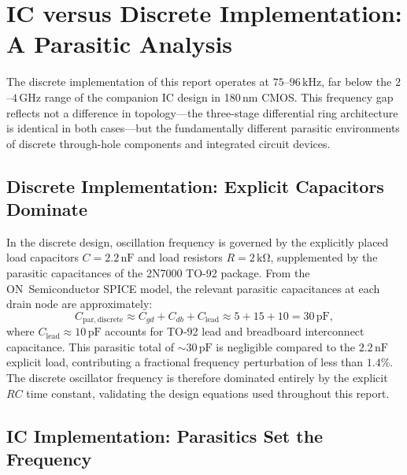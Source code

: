 \documentclass[11pt]{article}
\begin{document}
\section{IC versus Discrete Implementation: A Parasitic Analysis}
 
The discrete implementation of this report operates at $75$--$96\,\mathrm{kHz}$,
far below the $2$--$4\,\mathrm{GHz}$ range of the companion IC design in
180\,nm CMOS. This frequency gap reflects not a difference in topology---the
three-stage differential ring architecture is identical in both cases---but the
fundamentally different parasitic environments of discrete through-hole
components and integrated circuit devices.
 
\subsection{Discrete Implementation: Explicit Capacitors Dominate}
 
In the discrete design, oscillation frequency is governed by the explicitly
placed load capacitors $C = 2.2\,\mathrm{nF}$ and load resistors
$R = 2\,\mathrm{k\Omega}$, supplemented by the parasitic capacitances of the
2N7000 TO-92 package. From the ON~Semiconductor SPICE model, the relevant
parasitic capacitances at each drain node are approximately:
%
\begin{equation}
    C_{\mathrm{par,discrete}} \approx C_{gd} + C_{db} + C_{\mathrm{lead}}
    \approx 5 + 15 + 10 = 30\,\mathrm{pF},
\end{equation}
%
where $C_{\mathrm{lead}} \approx 10\,\mathrm{pF}$ accounts for TO-92 lead and
breadboard interconnect capacitance. This parasitic total of $\sim\!30\,\mathrm{pF}$
is negligible compared to the $2.2\,\mathrm{nF}$ explicit load, contributing
a fractional frequency perturbation of less than $1.4\%$. The discrete oscillator
frequency is therefore dominated entirely by the explicit $RC$ time constant,
validating the design equations used throughout this report.
 
\subsection{IC Implementation: Parasitics Set the Frequency}
 
\end{document}
